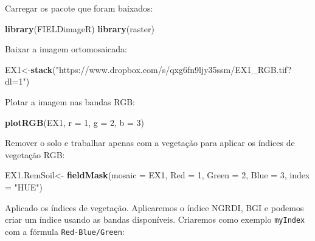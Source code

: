 \documentclass[
]{book}
\newenvironment{Shaded}{\begin{snugshade}}{\end{snugshade}}
\newcommand{\DataTypeTok}[1]{\textcolor[rgb]{0.13,0.29,0.53}{#1}}
\newcommand{\DecValTok}[1]{\textcolor[rgb]{0.00,0.00,0.81}{#1}}
\newcommand{\KeywordTok}[1]{\textcolor[rgb]{0.13,0.29,0.53}{\textbf{#1}}}
\newcommand{\NormalTok}[1]{#1}
\newcommand{\OperatorTok}[1]{\textcolor[rgb]{0.81,0.36,0.00}{\textbf{#1}}}
\newcommand{\StringTok}[1]{\textcolor[rgb]{0.31,0.60,0.02}{#1}}
\begin{document}
Carregar os pacote que foram baixados:

\begin{Shaded}
\begin{Highlighting}[]
\KeywordTok{library}\NormalTok{(FIELDimageR)}
\KeywordTok{library}\NormalTok{(raster)}
\end{Highlighting}
\end{Shaded}

Baixar a imagem ortomosaicada:

\begin{Shaded}
\begin{Highlighting}[]
\NormalTok{EX1<-}\KeywordTok{stack}\NormalTok{(}\StringTok{"https://www.dropbox.com/s/qxg6fn9ljy35ssm/EX1_RGB.tif?dl=1"}\NormalTok{)}
\end{Highlighting}
\end{Shaded}

Plotar a imagem nas bandas RGB:

\begin{Shaded}
\begin{Highlighting}[]
\KeywordTok{plotRGB}\NormalTok{(EX1, }\DataTypeTok{r =} \DecValTok{1}\NormalTok{, }\DataTypeTok{g =} \DecValTok{2}\NormalTok{, }\DataTypeTok{b =} \DecValTok{3}\NormalTok{)}
\end{Highlighting}
\end{Shaded}

Remover o solo e trabalhar apenas com a vegetação para aplicar os índices de vegetação RGB:

\begin{Shaded}
\begin{Highlighting}[]
\NormalTok{EX1.RemSoil<-}\StringTok{ }\KeywordTok{fieldMask}\NormalTok{(}\DataTypeTok{mosaic =}\NormalTok{ EX1, }\DataTypeTok{Red =} \DecValTok{1}\NormalTok{, }\DataTypeTok{Green =} \DecValTok{2}\NormalTok{, }\DataTypeTok{Blue =} \DecValTok{3}\NormalTok{, }\DataTypeTok{index =} \StringTok{"HUE"}\NormalTok{)}
\end{Highlighting}
\end{Shaded}

Aplicado os índices de vegetação.
Aplicaremos o índice NGRDI, BGI e podemos criar um índice usando as bandas disponíveis. Criaremos como exemplo \texttt{myIndex} com a fórmula \texttt{Red-Blue/Green}:

\begin{Shaded}
\end{Shaded}
\end{document}
